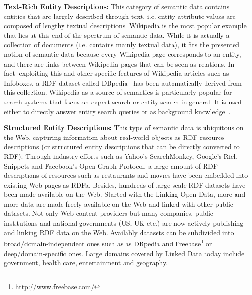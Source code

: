 \textbf{Text-Rich Entity Descriptions:} This category of semantic data contains entities that are largely described through text, i.e. entity attribute values are composed of lengthy textual descriptions. Wikipedia is the most popular example that lies at this end of the spectrum of semantic data. While it is actually a collection of documents (i.e. contains mainly textual data), it fits the presented notion of semantic data because every Wikipedia page corresponds to an entity, and there are links between Wikipedia pages that can be seen as relations. In fact, exploiting this and other specific features of Wikipedia articles such as Infoboxes, a RDF dataset called DBpedia~\cite{DBLP:journals/ws/BizerLKABCH09} has been automatically derived from this collection. Wikipedia as a source of semantics is particularly popular for search systems that focus on expert search or entity search in general. It is used either to directly answer entity search queries or as background knowledge~\cite{DBLP:conf/cikm/KapteinSVK10,DBLP:conf/cikm/BronBR10}. 


\textbf{Structured Entity Descriptions:} This type of semantic data is ubiquitous on the Web, capturing information about real-world objects as RDF resource descriptions (or structured entity descriptions that can be directly converted to RDF). Through industry efforts such as Yahoo's SearchMonkey, Google's Rich Snippets and Facebook's Open Graph Protocol, a large amount of RDF descriptions of resources such as restaurants and movies have been embedded into existing Web pages as RDFa. Besides, hundreds of large-scale RDF datasets have been made available on the Web. Started with the Linking Open Data, more and more data are made freely available on the Web and linked with other public datasets. Not only Web content providers but many companies, public institutions and national governments (US, UK etc.) are now actively publishing and linking RDF data on the Web. Availably datasets can be subdivided into broad/domain-independent ones such as as DBpedia and Freebase\footnote{\url{http://www.freebase.com/}} or deep/domain-specific ones. Large domains covered by Linked Data today include government, health care, entertainment and geography.  


